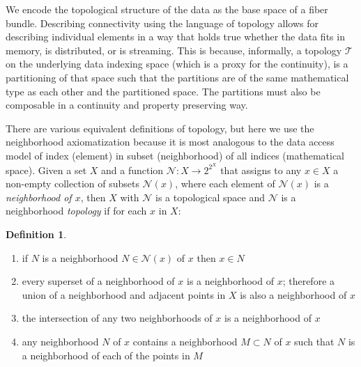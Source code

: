 \documentclass[journal]{IEEEtran}
\theoremstyle{definition}
\newtheorem{definition}{Definition}[section]
\theoremstyle{remark}
\begin{document}
We encode the topological structure of the data as the \textcolor{base}{base space} of a fiber bundle. Describing connectivity using the language of topology allows for describing individual elements in a way that holds true whether the data fits in memory, is distributed, or is streaming. This is because, informally, a topology $\mathcal{T}$ on the underlying data indexing space (which is a proxy for the continuity), is a partitioning of that space such that the partitions are of the same mathematical type as each other and the partitioned space. The partitions must also be composable in a continuity and property preserving way.

There are various equivalent definitions of topology, but here we use the neighborhood axiomatization because it is most analogous to the data access model of index (element) in subset (neighborhood) of all indices (mathematical space). Given a set $X$ and a function $\mathcal{N}:X\to 2^{2^X}$ that assigns to any $x\in X$ a non-empty collection of subsets $\mathcal{N}(x)$, where each element of $\mathcal{N}(x)$ is a \emph{neighborhood of $x$}, then $X$ with  $\mathcal{N}$ is a \textcolor{base}{topological space} and $\mathcal{N}$ is a neighborhood \emph{topology} if for each $x$ in $X$: \cite{brownronaldTopologyGroupoids2006}

\begin{definition}\label{def:topology}
\begin{enumerate}
  \item if $N$ is a neighborhood $N \in \mathcal{N}(x)$ of $x$ then $x \in N$
  \item every superset of a neighborhood of $x$ is a neighborhood of $x$; therefore a union of a neighborhood and adjacent points in $X$ is also a neighborhood of $x$
  \item the intersection of any two neighborhoods of $x$ is a neighborhood of $x$
  \item any neighborhood $N$ of $x$ contains a neighborhood $M \subset N$ of $x$ such that $N$ is a neighborhood of each of the points in $M$
\end{enumerate}
\end{definition}
\end{document}
